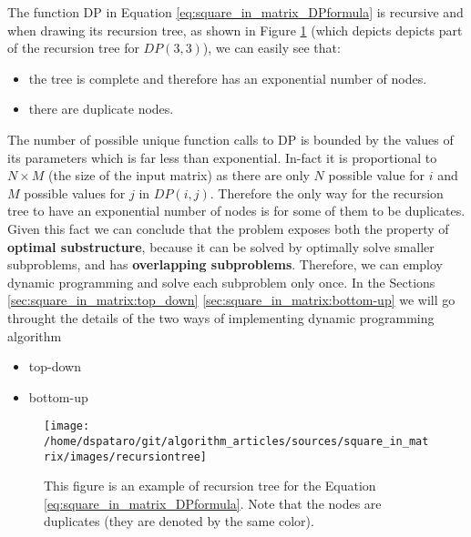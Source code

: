 The function DP in Equation \ref{eq:square_in_matrix_DPformula} is recursive and when drawing its
recursion tree, as shown in Figure \ref{fig:square_in_matrix:recursiontree} (which depicts depicts
part of the recursion tree for $DP(3,3)$),  we can easily see that:
\begin{itemize}
	\item the tree is complete and therefore has an exponential number of nodes.
	\item there are duplicate nodes.
\end{itemize} 
The number of possible unique function calls to DP is bounded by the values of its parameters which
is far less than exponential. In-fact it is proportional to $N \times M$ (the size of the input
matrix) as there are only $N$ possible value for $i$ and $M$ possible values for $j$ in $DP(i,j)$.
Therefore the only way for the recursion tree to have an exponential number of nodes is for some of
them to be duplicates. Given this fact we can conclude that the problem exposes both the property of
\textbf{optimal substructure}, because it can be solved by optimally solve smaller subproblems, and
has \textbf{overlapping subproblems}. Therefore, we can employ dynamic programming and solve each
subproblem only once. In the Sections \ref{sec:square_in_matrix:top_down}
\ref{sec:square_in_matrix:bottom-up} we will go throught the details of the two ways of implementing
dynamic programming algorithm
\begin{itemize}
	\item top-down 
	\item bottom-up
\end{itemize}

\begin{figure}
	\centering
	\label{fig:square_in_matrix:recursiontree}
	\texttt{[image: /home/dspataro/git/algorithm\_articles/sources/square\_in\_matrix/images/recursiontree]}
	\caption{This figure is an example of recursion tree for the Equation
	\ref{eq:square_in_matrix_DPformula}. Note that the nodes are duplicates (they are denoted by the
	same color). }
\end{figure}

